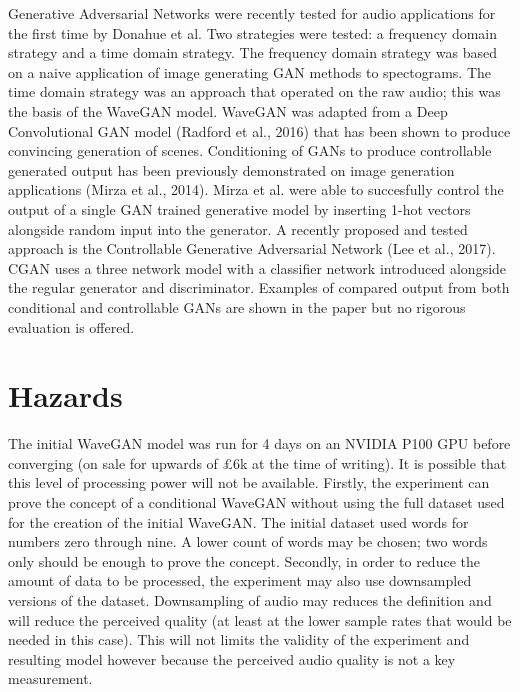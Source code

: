 \documentclass{article}
\begin{document}
Generative Adversarial Networks were recently tested for audio applications for the first time by Donahue et al.
Two strategies were tested: a frequency domain strategy and a time domain strategy.
The frequency domain strategy was based on a naive application of image generating GAN methods to spectograms.
The time domain strategy was an approach that operated on the raw audio; this was the basis of the WaveGAN model.
\newline
\newline
WaveGAN was adapted from a Deep Convolutional GAN model (Radford et al., 2016) that has been shown to produce convincing generation of scenes.
\newline
\newline
Conditioning of GANs to produce controllable generated output has been previously demonstrated on image generation applications (Mirza et al., 2014).
Mirza et al. were able to succesfully control the output of a single GAN trained generative model by inserting 1-hot vectors alongside random input into the generator.
\newline
\newline
A recently proposed and tested approach is the Controllable Generative Adversarial Network (Lee et al., 2017).
CGAN uses a three network model with a classifier network introduced alongside the regular generator and discriminator.
Examples of compared output from both conditional and controllable GANs are shown in the paper but no rigorous evaluation is offered.

\section{Hazards}

The initial WaveGAN model was run for 4 days on an NVIDIA P100 GPU before converging (on sale for upwards of £6k at the time of writing).
It is possible that this level of processing power will not be available.
\newline
\newline
Firstly, the experiment can prove the concept of a conditional WaveGAN without using the full dataset used for the creation of the initial WaveGAN.
The initial dataset used words for numbers zero through nine.
A lower count of words may be chosen; two words only should be enough to prove the concept.
\newline
\newline
Secondly, in order to reduce the amount of data to be processed, the experiment may also use downsampled versions of the dataset.
Downsampling of audio may reduces the definition and will reduce the perceived quality (at least at the lower sample rates that would be needed in this case).
This will not limits the validity of the experiment and resulting model however because the perceived audio quality is not a key measurement.
\end{document}
